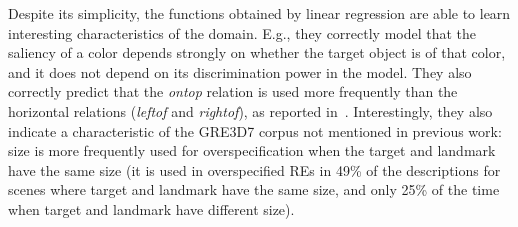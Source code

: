 Despite its simplicity, the functions obtained by linear regression are able to learn interesting 
characteristics of the domain.  E.g., they correctly model that the saliency of a color depends 
strongly on whether the target object is of that color, and it does not depend on its discrimination power 
in the model.  They also correctly predict that the \emph{ontop} relation is used more frequently than 
the horizontal relations (\emph{leftof} and \emph{rightof}), as reported in~\cite{viet:gene11}. Interestingly, 
they also indicate a characteristic of the GRE3D7 corpus not mentioned in previous work: size is more 
frequently used for overspecification when the target and landmark have the same size (it is used in 
overspecified REs in 49\% of the descriptions for scenes where target and landmark have the same size, and only 25\% of the time when target and landmark have different size). %
